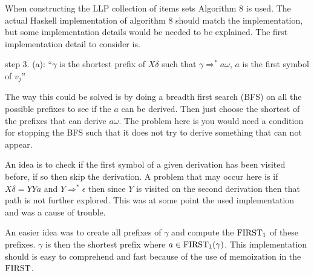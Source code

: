 When constructing the LLP collection of items sets Algorithm 8 \cite[13]{Vagner2007} is used. The actual Haskell implementation of algorithm 8 should match the implementation, but some implementation details would be needed to be explained. The first implementation detail to consider is. 
\begin{center}
    step 3. (a): ``$\gamma$ is the shortest prefix of $X\delta$ such that $\gamma \Rightarrow^* a \omega$, $a$ is the first symbol of $v_j$'' \cite{errata:Vagner2007}
\end{center}
The way this could be solved is by doing a breadth first search (BFS) on all the possible prefixes to see if the $a$ can be derived. Then just choose the shortest of the prefixes that can derive $a\omega$.  The problem here is you would need a condition for stopping the BFS such that it does not try to derive something that can not appear.

An idea is to check if the first symbol of a given derivation has been visited before, if so then skip the derivation. A problem that may occur here is if $X\delta = YYa$ and $Y \Rightarrow^* \epsilon$ then since $Y$ is visited on the second derivation then that path is not further explored. This was at some point the used implementation and was a cause of trouble.

An easier idea was to create all prefixes of $\gamma$ and compute the $\text{FIRST}_1$ of these prefixes. $\gamma$ is then the shortest prefix where $a \in \text{FIRST}_1(\gamma)$. This implementation should is easy to comprehend and fast because of the use of memoization in the $\text{FIRST}$.
